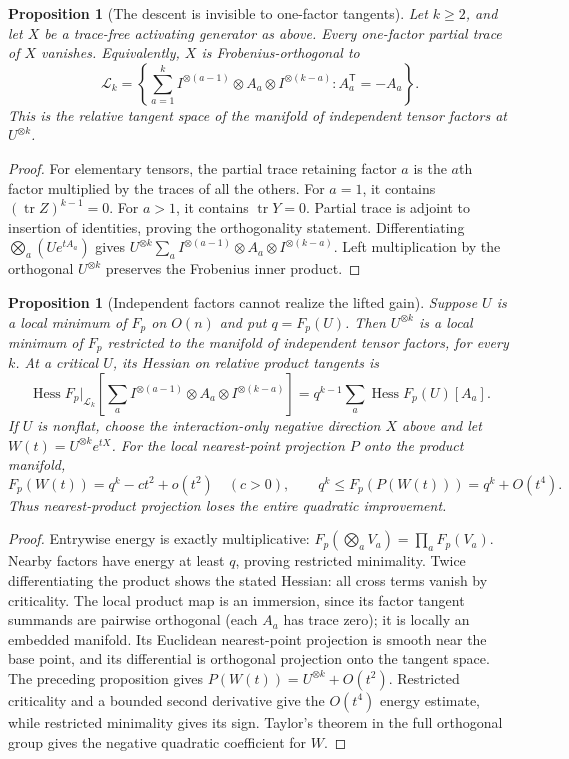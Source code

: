 \documentclass[11pt]{article}
\newtheorem{proposition}[theorem]{Proposition}
\begin{document}
\begin{proposition}[The descent is invisible to one-factor tangents]
Let $k\ge2$, and let $X$ be a trace-free activating generator as above.
Every one-factor partial trace of $X$ vanishes. Equivalently, $X$ is
Frobenius-orthogonal to
\[
 \mathcal L_k=\left\{
 \sum_{a=1}^k I^{\otimes(a-1)}\otimes A_a\otimes
 I^{\otimes(k-a)}: A_a^{\mathsf T}=-A_a\right\}.
\]
This is the relative tangent space of the manifold of independent
tensor factors at $U^{\otimes k}$.
\end{proposition}
\begin{proof}
For elementary tensors, the partial trace retaining factor $a$ is
the $a$th factor multiplied by the traces of all the others.
For $a=1$, it contains $(\operatorname{tr}Z)^{k-1}=0$.
For $a>1$, it contains $\operatorname{tr}Y=0$. Partial trace is adjoint
to insertion of identities, proving the orthogonality statement.
Differentiating $\bigotimes_a(Ue^{tA_a})$ gives
$U^{\otimes k}\sum_a I^{\otimes(a-1)}\otimes A_a\otimes
I^{\otimes(k-a)}$. Left multiplication by the orthogonal
$U^{\otimes k}$ preserves the Frobenius inner product.
\end{proof}

\begin{proposition}[Independent factors cannot realize the lifted gain]
Suppose $U$ is a local minimum of $F_p$ on $O(n)$ and put $q=F_p(U)$.
Then $U^{\otimes k}$ is a local minimum of $F_p$ restricted to the
manifold of independent tensor factors, for every $k$. At a critical
$U$, its Hessian on relative product tangents is
\[
 \operatorname{Hess}F_p\big|_{\mathcal L_k}
 \left[\sum_a I^{\otimes(a-1)}\otimes A_a\otimes
 I^{\otimes(k-a)}\right]
 =q^{k-1}\sum_a \operatorname{Hess}F_p(U)[A_a].
\]
If $U$ is nonflat, choose the interaction-only negative direction $X$
above and let $W(t)=U^{\otimes k}e^{tX}$. For the local nearest-point
projection $P$ onto the product manifold,
\[
 F_p(W(t))=q^k-c t^2+o(t^2)\quad(c>0),\qquad
 q^k\le F_p(P(W(t)))=q^k+O(t^4).
\]
Thus nearest-product projection loses the entire quadratic improvement.
\end{proposition}
\begin{proof}
Entrywise energy is exactly multiplicative:
$F_p(\bigotimes_a V_a)=\prod_a F_p(V_a)$.
Nearby factors have energy at least $q$, proving restricted minimality.
Twice differentiating the product shows the stated Hessian: all cross
terms vanish by criticality. The local product map is an immersion,
since its factor tangent summands are pairwise orthogonal (each $A_a$
has trace zero); it is locally an embedded manifold. Its Euclidean
nearest-point projection is smooth near the base point, and its
differential is orthogonal projection onto the tangent space.
The preceding proposition gives
$P(W(t))=U^{\otimes k}+O(t^2)$. Restricted criticality and a bounded
second derivative give the $O(t^4)$ energy estimate, while restricted
minimality gives its sign. Taylor's theorem in the full orthogonal
group gives the negative quadratic coefficient for $W$.
\end{proof}
\end{document}
